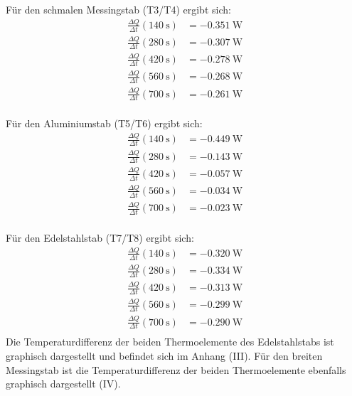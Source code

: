 Für den schmalen Messingstab (T3/T4) ergibt sich:
\begin{align*} %
   \frac{\Delta Q}{\Delta t}(\SI{140}{\second}) &= \SI{-0.351}{\watt} \\ 
   \frac{\Delta Q}{\Delta t}(\SI{280}{\second}) &= \SI{-0.307}{\watt} \\ 
   \frac{\Delta Q}{\Delta t}(\SI{420}{\second}) &= \SI{-0.278}{\watt} \\ 
   \frac{\Delta Q}{\Delta t}(\SI{560}{\second}) &= \SI{-0.268}{\watt} \\ 
   \frac{\Delta Q}{\Delta t}(\SI{700}{\second}) &= \SI{-0.261}{\watt} \\ 
\end{align*}

Für den Aluminiumstab (T5/T6) ergibt sich:
\begin{align*} %
   \frac{\Delta Q}{\Delta t}(\SI{140}{\second}) &= \SI{-0.449}{\watt} \\ 
   \frac{\Delta Q}{\Delta t}(\SI{280}{\second}) &= \SI{-0.143}{\watt} \\ 
   \frac{\Delta Q}{\Delta t}(\SI{420}{\second}) &= \SI{-0.057}{\watt} \\ 
   \frac{\Delta Q}{\Delta t}(\SI{560}{\second}) &= \SI{-0.034}{\watt} \\ 
   \frac{\Delta Q}{\Delta t}(\SI{700}{\second}) &= \SI{-0.023}{\watt} \\ 
\end{align*}

Für den Edelstahlstab (T7/T8) ergibt sich:
\begin{align*} %
   \frac{\Delta Q}{\Delta t}(\SI{140}{\second}) &= \SI{-0.320}{\watt} \\ 
   \frac{\Delta Q}{\Delta t}(\SI{280}{\second}) &= \SI{-0.334}{\watt} \\ 
   \frac{\Delta Q}{\Delta t}(\SI{420}{\second}) &= \SI{-0.313}{\watt} \\ 
   \frac{\Delta Q}{\Delta t}(\SI{560}{\second}) &= \SI{-0.299}{\watt} \\ 
   \frac{\Delta Q}{\Delta t}(\SI{700}{\second}) &= \SI{-0.290}{\watt} \\ 
\end{align*}
\newline
Die Temperaturdifferenz der beiden Thermoelemente des Edelstahlstabs
ist graphisch dargestellt und befindet sich im Anhang (III).
Für den breiten Messingstab ist die Temperaturdifferenz der beiden
Thermoelemente ebenfalls graphisch dargestellt (IV).

